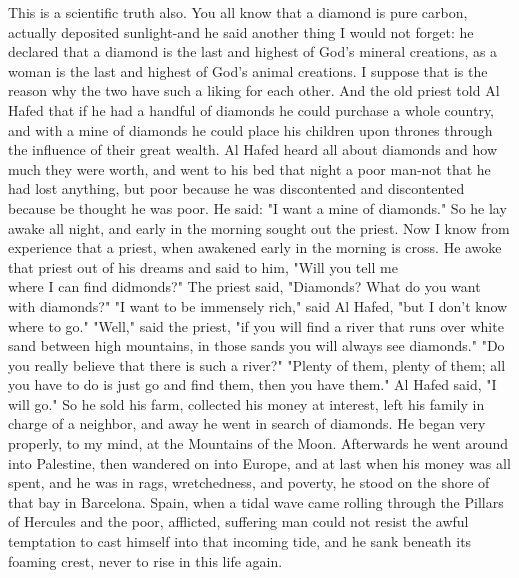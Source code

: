 \documentclass[10pt]{article}
\begin{document}
This is a scientific truth also. You all know that a diamond is pure carbon, actually deposited sunlight-and he said another thing I would not forget: he declared that a diamond is the last and highest of God's mineral creations, as a woman is the last and highest of God's animal creations. I suppose that is the reason why the two have such a liking for each other. And the old priest told Al Hafed that if he had a handful of diamonds he could purchase a whole country, and with a mine of diamonds he could place his children upon thrones through the influence of their great wealth. Al Hafed heard all about diamonds and how much they were worth, and went to his bed that night a poor man-not that he had lost anything, but poor because he was discontented and discontented because be thought he was poor. He said: "I want a mine of diamonds." So he lay awake all night, and early in the morning sought out the priest. Now I know from experience that a priest, when awakened early in the morning is cross. He awoke that priest out of his dreams and said to him, "Will you tell me\\
where I can find didmonds?" The priest said, "Diamonds? What do you want with diamonds?" "I want to be immensely rich," said Al Hafed, "but I don't know where to go." "Well," said the priest, "if you will find a river that runs over white sand between high mountains, in those sands you will always see diamonds." "Do you really believe that there is such a river?" "Plenty of them, plenty of them; all you have to do is just go and find them, then you have them." Al Hafed said, "I will go." So he sold his farm, collected his money at interest, left his family in charge of a neighbor, and away he went in search of diamonds. He began very properly, to my mind, at the Mountains of the Moon. Afterwards he went around into Palestine, then wandered on into Europe, and at last when his money was all spent, and he was in rags, wretchedness, and poverty, he stood on the shore of that bay in Barcelona. Spain, when a tidal wave came rolling through the Pillars of Hercules and the poor, afflicted, suffering man could not resist the awful temptation to cast himself into that incoming tide, and he sank beneath its foaming crest, never to rise in this life again.
\end{document}
